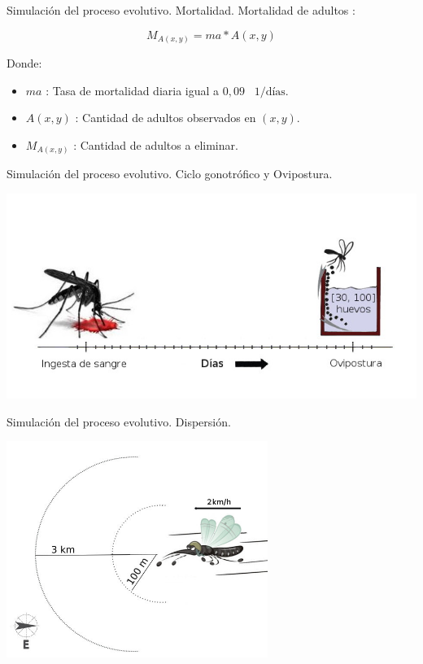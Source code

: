 \begin{frame}[c]{Simulación del proceso evolutivo. Mortalidad.}
  Mortalidad de adultos :
  \begin{center}
    \begin{equation}
        M_{A(x,y)} = ma * A(x,y)
    \end{equation}
  \end{center}
  Donde:
    \begin{itemize}
      \item $ma$ : Tasa de mortalidad diaria igual a $0,09$ \ $1/\text{días}$.
      \item $A(x, y)$ : Cantidad de adultos observados en $(x,y)$.
      \item $M_{A(x,y)}$ : Cantidad de adultos a eliminar.
    \end{itemize}
\end{frame}

\begin{frame}[c]{Simulación del proceso evolutivo. Ciclo gonotrófico y Ovipostura.}
  \begin{center}
      \includegraphics[width=\textwidth]{./graphics/cliclo-gonotrofico-tiempo.jpg}
  \end{center}
\end{frame}

\begin{frame}[c]{Simulación del proceso evolutivo. Dispersión.}
  \begin{center}
    \includegraphics[width=8.5cm]{./graphics/dispersion.jpg}
  \end{center}
\end{frame}

